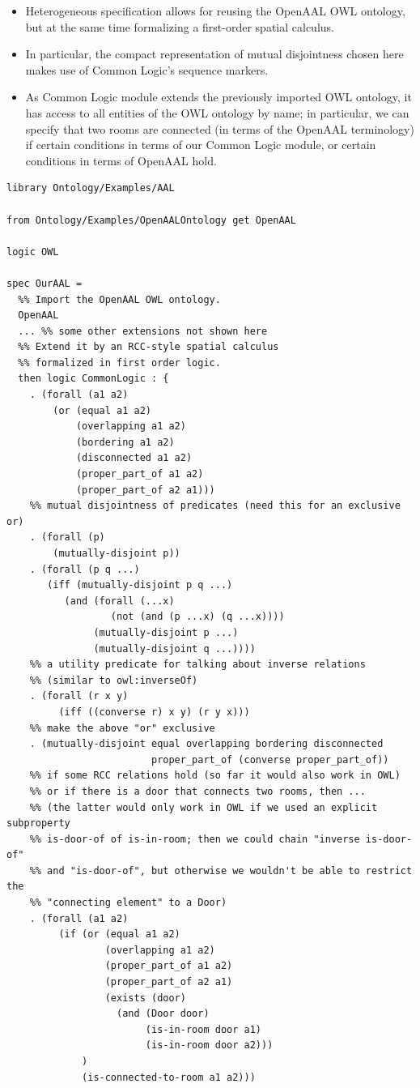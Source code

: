 \documentclass{article}
\begin{document}
\begin{itemize}
\item Heterogeneous specification allows for reusing the OpenAAL OWL ontology, but at the same time formalizing a first-order spatial calculus.
\item In particular, the compact representation of mutual disjointness chosen here makes use of Common Logic's sequence markers.
\item As Common Logic module extends the previously imported OWL ontology, it has access to all entities of the OWL ontology by name; in particular, we can specify that two rooms are connected (in terms of the OpenAAL terminology) if certain conditions in terms of our Common Logic module, or certain conditions in terms of OpenAAL hold.
\end{itemize}

\begin{lstlisting}[language=HetCASL,basicstyle={\small\ttfamily},morekeywords={exists,forall,or,iff,not,if},alsoletter={-}]
library Ontology/Examples/AAL

from Ontology/Examples/OpenAALOntology get OpenAAL

logic OWL

spec OurAAL =
  %% Import the OpenAAL OWL ontology.
  OpenAAL
  ... %% some other extensions not shown here
  %% Extend it by an RCC-style spatial calculus
  %% formalized in first order logic.
  then logic CommonLogic : {
    . (forall (a1 a2)
        (or (equal a1 a2)
            (overlapping a1 a2)
            (bordering a1 a2)
            (disconnected a1 a2)
            (proper_part_of a1 a2)
            (proper_part_of a2 a1)))
    %% mutual disjointness of predicates (need this for an exclusive or)
    . (forall (p)
        (mutually-disjoint p))
    . (forall (p q ...)
       (iff (mutually-disjoint p q ...)
          (and (forall (...x)
                  (not (and (p ...x) (q ...x))))
               (mutually-disjoint p ...)
               (mutually-disjoint q ...))))
    %% a utility predicate for talking about inverse relations
    %% (similar to owl:inverseOf)
    . (forall (r x y)
         (iff ((converse r) x y) (r y x)))
    %% make the above "or" exclusive
    . (mutually-disjoint equal overlapping bordering disconnected
                         proper_part_of (converse proper_part_of))
    %% if some RCC relations hold (so far it would also work in OWL)
    %% or if there is a door that connects two rooms, then ...
    %% (the latter would only work in OWL if we used an explicit subproperty
    %% is-door-of of is-in-room; then we could chain "inverse is-door-of"
    %% and "is-door-of", but otherwise we wouldn't be able to restrict the
    %% "connecting element" to a Door)
    . (forall (a1 a2)
         (if (or (equal a1 a2)
                 (overlapping a1 a2)
                 (proper_part_of a1 a2)
                 (proper_part_of a2 a1)
                 (exists (door)
                   (and (Door door)
                        (is-in-room door a1)
                        (is-in-room door a2)))
             )
             (is-connected-to-room a1 a2)))
\end{lstlisting}
\end{document}
